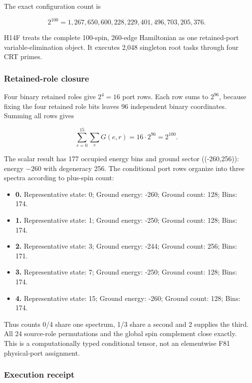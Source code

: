 The exact configuration count is

\[
2^{100}
=1{,}267{,}650{,}600{,}228{,}229{,}401{,}496{,}703{,}205{,}376.
\]

H14F treats the complete 100-spin, 260-edge Hamiltonian as one
retained-port variable-elimination object. It executes 2,048 singleton
root tasks through four CRT primes.

\subsubsection{Retained-role closure}\label{viii-ch01-retained-role-closure}

Four binary retained roles give \(2^4=16\) port rows. Each row sums to
\(2^{96}\), because fixing the four retained role bits leaves 96
independent binary coordinates. Summing all rows gives

\[
\sum_{r=0}^{15}\sum_eG(e,r)
=16\cdot2^{96}
=2^{100}.
\]

The scalar result has 177 occupied energy bins and ground sector
((-260,256)): energy \(-260\) with degeneracy 256. The conditional port
rows organize into three spectra according to plus-spin count:

\begin{itemize}
\tightlist
\item
  \textbf{0.} Representative state: 0; Ground energy: -260; Ground
  count: 128; Bins: 174.
\item
  \textbf{1.} Representative state: 1; Ground energy: -250; Ground
  count: 128; Bins: 174.
\item
  \textbf{2.} Representative state: 3; Ground energy: -244; Ground
  count: 256; Bins: 171.
\item
  \textbf{3.} Representative state: 7; Ground energy: -250; Ground
  count: 128; Bins: 174.
\item
  \textbf{4.} Representative state: 15; Ground energy: -260; Ground
  count: 128; Bins: 174.
\end{itemize}

Thus counts 0/4 share one spectrum, 1/3 share a second and 2 supplies
the third. All 24 source-role permutations and the global spin
complement close exactly. This is a computationally typed conditional
tensor, not an elementwise F81 physical-port assignment.

\subsubsection{Execution receipt}\label{viii-ch01-execution-receipt}

